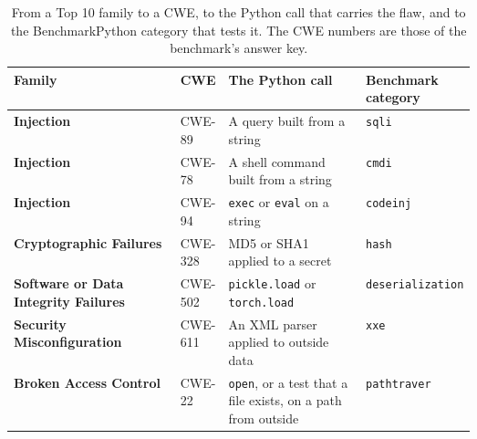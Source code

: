 \begin{table}[t]
  \caption{From a Top 10 family to a CWE, to the Python call that carries the flaw, and to the
  BenchmarkPython category that tests it. The CWE numbers are those of the benchmark's answer key.}
  \label{tab:discovery-hierarchy}
  \begin{adjustbox}{width=\linewidth}\begin{tabularx}{\linewidth}{L{0.36\linewidth}L{0.08\linewidth}XL{0.15\linewidth}}
    \toprule
    \textbf{Family} & \textbf{CWE} & \textbf{The Python call} & \textbf{Benchmark category} \\
    \midrule
    \textbf{Injection} & CWE-89 & A query built from a string & \texttt{sqli} \\
    \textbf{Injection} & CWE-78 & A shell command built from a string & \texttt{cmdi} \\
    \textbf{Injection} & CWE-94 & \texttt{exec} or \texttt{eval} on a string & \texttt{codeinj} \\
    \textbf{Cryptographic Failures} & CWE-328 & MD5 or SHA1 applied to a secret & \texttt{hash} \\
    \textbf{Software or Data Integrity Failures} & CWE-502 & \texttt{pickle.load} or \texttt{torch.load} & \texttt{deserialization} \\
    \textbf{Security Misconfiguration} & CWE-611 & An XML parser applied to outside data & \texttt{xxe} \\
    \textbf{Broken Access Control} & CWE-22 & \texttt{open}, or a test that a file exists, on a path from outside & \texttt{pathtraver} \\
    \bottomrule
  \end{tabularx}\end{adjustbox}
\end{table}

